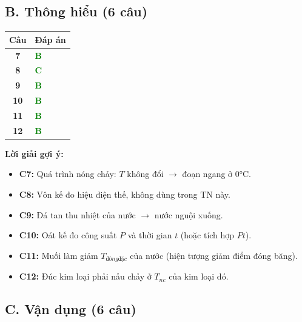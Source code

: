 \documentclass[12pt,a4paper]{article}
\newcommand{\dapan}[1]{\textcolor{green}{\textbf{#1}}}
\begin{document}
\subsection*{B. Thông hiểu (6 câu)}

\begin{longtable}{>{\bfseries}cl}
\toprule
Câu & Đáp án \\ \midrule
7 & \dapan{B} \\ 
8 & \dapan{C} \\ 
9 & \dapan{B} \\ 
10 & \dapan{B} \\ 
11 & \dapan{B} \\ 
12 & \dapan{B} \\ \bottomrule
\end{longtable}

\noindent\textbf{Lời giải gợi ý:}
\begin{itemize}
    \item \textbf{C7:} Quá trình nóng chảy: $T$ không đổi $\to$ đoạn ngang ở 0°C.
    \item \textbf{C8:} Vôn kế đo hiệu điện thế, không dùng trong TN này.
    \item \textbf{C9:} Đá tan thu nhiệt của nước $\to$ nước nguội xuống.
    \item \textbf{C10:} Oát kế đo công suất $P$ và thời gian $t$ (hoặc tích hợp $Pt$).
    \item \textbf{C11:} Muối làm giảm $T_{đông đặc}$ của nước (hiện tượng giảm điểm đóng băng).
    \item \textbf{C12:} Đúc kim loại phải nấu chảy ở $T_{nc}$ của kim loại đó.
\end{itemize}

\subsection*{C. Vận dụng (6 câu)}
\end{document}
